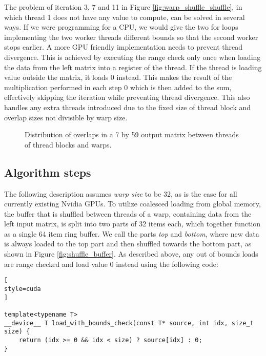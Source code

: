 The problem of iteration 3, 7 and 11 in Figure \ref{fig:warp_shuffle_shuffle}, in which thread 1 does not have any value to compute, can be solved in several ways. If we were programming for a CPU, we would give the two for loops implementing the two worker threads different bounds so that the second worker stops earlier. A more GPU friendly implementation needs to prevent thread divergence. This is achieved by executing the range check only once when loading the data from the left matrix into a register of the thread. If the thread is loading value outside the matrix, it loads 0 instead. This makes the result of the multiplication performed in each step 0 which is then added to the sum, effectively skipping the iteration while preventing thread divergence. This also handles any extra threads introduced due to the fixed size of thread block and overlap sizes not divisible by warp size.

\begin{figure}[ht]
	\centering
	\def\svgwidth{0.8\textwidth}
	
	\caption{Distribution of overlaps in a 7 by 59 output matrix between threads of thread blocks and warps.}
	\label{fig:warp_shuffle_simple_dist}
\end{figure}

\subsection{Algorithm steps}
\label{sec:simplified_warp_shuffle_steps}

The following description assumes \textit{warp size} to be 32, as is the case for all currently existing Nvidia GPUs. To utilize coalesced loading from global memory, the buffer that is shuffled between threads of a warp, containing data from the left input matrix, is split into two parts of 32 items each, which together function as a single 64 item ring buffer. We call the parts \textit{top} and \textit{bottom}, where new data is always loaded to the top part and then shuffled towards the bottom part, as shown in Figure \ref{fig:shuffle_buffer}. As described above, any out of bounds loads are range checked and load value 0 instead using the following code:
\begin{lstlisting}[
style=cuda
]

template<typename T>
__device__ T load_with_bounds_check(const T* source, int idx, size_t size) {
	return (idx >= 0 && idx < size) ? source[idx] : 0;
}
\end{lstlisting}


